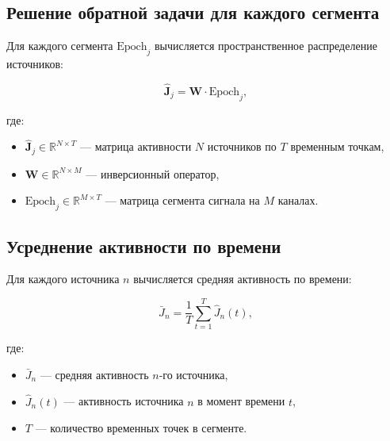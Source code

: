 \subsection{Решение обратной задачи для каждого сегмента}

Для каждого сегмента \(\text{Epoch}_j\) вычисляется пространственное распределение источников:

\begin{equation}
\hat{\mathbf{J}}_j = \mathbf{W} \cdot \text{Epoch}_j,
\label{eq:epoch_inverse}
\end{equation}

где:
\begin{itemize}
    \item \(\hat{\mathbf{J}}_j \in \mathbb{R}^{N \times T}\) — матрица активности \(N\) источников по \(T\) временным точкам,
    \item \(\mathbf{W} \in \mathbb{R}^{N \times M}\) — инверсионный оператор,
    \item \(\text{Epoch}_j \in \mathbb{R}^{M \times T}\) — матрица сегмента сигнала на \(M\) каналах.
\end{itemize}

\subsection{Усреднение активности по времени}

Для каждого источника \(n\) вычисляется средняя активность по времени:

\begin{equation}
\bar{J}_n = \frac{1}{T} \sum_{t=1}^{T} \hat{J}_n(t),
\label{eq:mean_activity}
\end{equation}

где:
\begin{itemize}
    \item \(\bar{J}_n\) — средняя активность \(n\)-го источника,
    \item \(\hat{J}_n(t)\) — активность источника \(n\) в момент времени \(t\),
    \item \(T\) — количество временных точек в сегменте.
\end{itemize}




\endinput